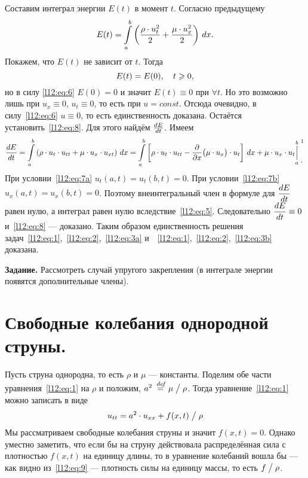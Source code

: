 Составим интеграл энергии $E(t)$ в момент $t$. Согласно предыдущему 
\begin{equation*}
	\hfill E(t)=\int\limits_a^b\left(\frac{\rho\cdot u^2_t}{2}+\frac{\mu\cdot u^2_x}{2}\right)\,dx.\hfill
\end{equation*} 
Покажем, что $E(t)$ не зависит от $t$. Тогда 
\begin{equation}
	\label{l12:eq:8}
	\hfill E(t)=E(0),\quad t\geqslant0,\hfill
\end{equation}
но в силу \eqref{l12:eq:6} $E(0)=0$ и значит $E(t)\equiv0$ при $\forall t$. Но это возможно лишь при $u_x\equiv0$, $u_t\equiv0$, то есть при $u=const$. Отсюда очевидно, в силу~\eqref{l12:eq:6} $u\equiv0$, то есть единственность доказана. Остаётся установить~\eqref{l12:eq:8}. Для этого найдём $\frac{dE}{dt}$. Имеем 
\begin{equation*}
	\der{E}{t}=\int\limits_a^b\left(\rho\cdot u_t\cdot u_{tt}+\mu\cdot u_x\cdot u_{xt}\right)\,dx=\int\limits_a^b\left[\rho\cdot u_t\cdot u_{tt}-\pder{}{x}\big(\mu\cdot u_x\big)\cdot u_t\right]\,dx+\mu\cdot u_x\cdot u_t{\mathop{\Big|}\limits_a^b}\phantom{|}{\vphantom{\bigg|}}^{\footnotemark{}}_{\displaystyle.}
\end{equation*}
При условии~\eqref{l12:eq:7a} $u_t(a,t)=u_t(b,t)=0$. При условии~\eqref{l12:eq:7b} $u_x(a,t)=u_x(b,t)=0$. Поэтому внеинтегральный член в формуле для $\displaystyle\frac{dE}{dt}$ равен нулю, а интеграл равен нулю вследствие~\eqref{l12:eq:5}. Следовательно $\displaystyle\frac{dE}{dt}\equiv0$ и~\eqref{l12:eq:8} --- доказано. Таким образом единственность решения задач~\eqref{l12:eq:1},~\eqref{l12:eq:2},~\eqref{l12:eq:3a} и~~\eqref{l12:eq:1},~\eqref{l12:eq:2},~\eqref{l12:eq:3b} доказана.
\vspace{0.2cm}

\noindent\textbf{Задание. }Рассмотреть случай упругого закрепления (в интеграле энергии появятся дополнительные члены).

\section{Свободные колебания однородной струны.}
\label{lecture12section2}
Пусть струна однородна, то есть $\rho$ и $\mu$ --- константы. Поделим обе части уравнения~\eqref{l12:eq:1} на $\rho$ и положим, $a^2\stackrel{\hspace{0.09 cm}de\!f}{=}{\mu}\bigm/{\rho}$. Тогда уравнение~\eqref{l12:eq:1} можно записать в виде
\begin{equation}
	\label{l12:eq:9}
	\hfill u_{tt}=a^2\cdot u_{xx}+f(x,t)\bigm/\rho\hfill
\end{equation}
Мы рассматриваем свободные колебания струны и значит $f(x,t)=0$. Однако уместно заметить, что если бы на струну действовала распределённая сила с плотностью $f(x,t)$ на единицу длины, то в уравнение колебаний вошла бы --- как видно из~\eqref{l12:eq:9} --- плотность силы на единицу массы, то есть $f\bigm/\rho$.

